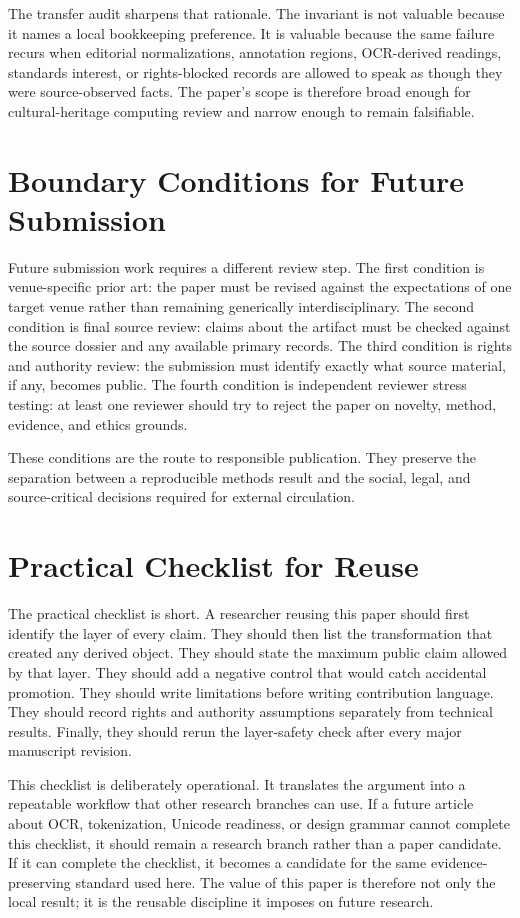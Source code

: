 \documentclass[sigconf,nonacm]{acmart}
\begin{document}
The transfer audit sharpens that rationale. The invariant is not valuable
because it names a local bookkeeping preference. It is valuable because the same
failure recurs when editorial normalizations, annotation regions, OCR-derived
readings, standards interest, or rights-blocked records are allowed to speak as
though they were source-observed facts. The paper's scope is therefore broad
enough for cultural-heritage computing review and narrow enough to remain
falsifiable.

\section{Boundary Conditions for Future Submission}
Future submission work requires a
different review step. The first condition is venue-specific prior art: the paper must
be revised against the expectations of one target venue rather than remaining
generically interdisciplinary. The second condition is final source review:
claims about the artifact must be checked against the source dossier and any
available primary records. The third condition is rights and authority review:
the submission must identify exactly what source material, if any, becomes
public. The fourth condition is independent reviewer stress testing: at least one
reviewer should try to reject the paper on novelty, method, evidence, and ethics
grounds.

These conditions are the route to responsible publication. They preserve the
separation between a reproducible methods result and the social, legal, and
source-critical decisions required for external circulation.

\section{Practical Checklist for Reuse}
The practical checklist is short. A researcher reusing this paper should first
identify the layer of every claim. They should then list the transformation that
created any derived object. They should state the maximum public claim allowed
by that layer. They should add a negative control that would catch accidental
promotion. They should write limitations before writing contribution language.
They should record rights and authority assumptions separately from technical
results. Finally, they should rerun the layer-safety check after every major
manuscript revision.

This checklist is deliberately operational. It translates the argument into a
repeatable workflow that other research branches can use. If a future article
about OCR, tokenization, Unicode readiness, or design grammar cannot complete
this checklist, it should remain a research branch rather than a paper
candidate. If it can complete the checklist, it becomes a candidate for the same
evidence-preserving standard used here. The value of this paper is therefore not
only the local result; it is the reusable discipline it imposes on future
research.
\end{document}
